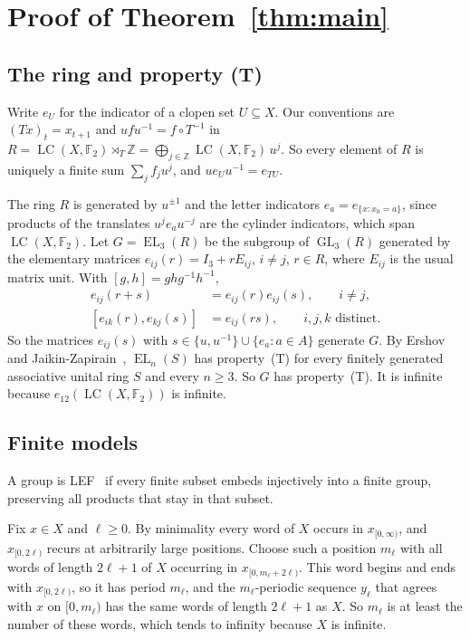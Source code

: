 \documentclass[11pt]{amsart}
\newcommand{\F}{\mathbb F}
\newcommand{\Z}{\mathbb Z}
\newcommand{\LC}{\operatorname{LC}}
\newcommand{\EL}{\operatorname{EL}}
\newcommand{\GL}{\operatorname{GL}}
\begin{document}
\section{Proof of Theorem~\ref{thm:main}}

\subsection*{The ring and property (T)}
Write $e_U$ for the indicator of a clopen set $U\subseteq X$. Our
conventions are $(Tx)_t=x_{t+1}$ and $ufu^{-1}=f\circ T^{-1}$ in
$R=\LC(X,\F_2)\rtimes_T\Z=\bigoplus_{j\in\Z}\LC(X,\F_2)\,u^j$. So every
element of $R$ is uniquely a finite sum $\sum_jf_ju^j$, and
$ue_Uu^{-1}=e_{TU}$.

The ring $R$ is generated by $u^{\pm1}$ and the letter indicators
$e_a=e_{\{x:x_0=a\}}$, since products of the translates $u^je_au^{-j}$
are the cylinder indicators, which span $\LC(X,\F_2)$. Let $G=\EL_3(R)$
be the subgroup of $\GL_3(R)$ generated by the elementary matrices
$e_{ij}(r)=I_3+rE_{ij}$, $i\ne j$, $r\in R$, where $E_{ij}$ is the usual
matrix unit. With $[g,h]=ghg^{-1}h^{-1}$,
\begin{equation}\label{eq:elementary}
 \begin{aligned}
 e_{ij}(r+s)&=e_{ij}(r)e_{ij}(s),\qquad i\ne j,\\
 [e_{ik}(r),e_{kj}(s)]&=e_{ij}(rs),\qquad i,j,k\text{ distinct}.
 \end{aligned}
\end{equation}
So the matrices $e_{ij}(s)$ with $s\in\{u,u^{-1}\}\cup\{e_a:a\in A\}$
generate $G$. By Ershov and Jaikin-Zapirain~\cite[Theorem~1.1]{EJZ},
$\EL_n(S)$ has property~\textup{(T)} for every finitely generated
associative unital ring $S$ and every $n\ge3$. So $G$ has
property~\textup{(T)}. It is infinite because $e_{12}(\LC(X,\F_2))$ is
infinite.

\subsection*{Finite models}
A group is LEF~\cite{VershikGordon} if every finite subset embeds
injectively into a finite group, preserving all products that stay in
that subset.

Fix $x\in X$ and $\ell\ge0$. By minimality every word of $X$ occurs in
$x_{[0,\infty)}$, and $x_{[0,2\ell)}$ recurs at arbitrarily large
positions. Choose such a position $m_\ell$ with all words of length
$2\ell+1$ of $X$ occurring in $x_{[0,m_\ell+2\ell)}$. This word begins
and ends with $x_{[0,2\ell)}$, so it has period $m_\ell$, and the
$m_\ell$-periodic sequence $y_\ell$ that agrees with $x$ on $[0,m_\ell)$
has the same words of length $2\ell+1$ as $X$. So $m_\ell$ is at least
the number of these words, which tends to infinity because $X$ is
infinite.
\end{document}
